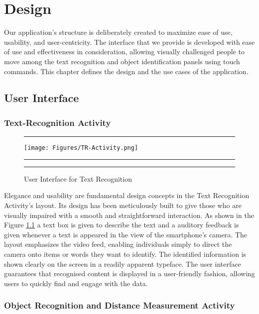 \documentclass[MScCS]{uccthesis}
\begin{document}
\chapter{Design}
Our application's structure is deliberately created to maximize ease of use, usability, and user-centricity. The interface that we provide is developed with ease of use and effectiveness in consideration, allowing visually challenged people to move among the text recognition and object identification panels using touch commands. This chapter defines the design and the use cases of the application.
\section{User Interface}

\subsection{Text-Recognition Activity}
\begin{figure}[H]
      \hrule
      \vspace{0.5em}
     \centering
      \texttt{[image: Figures/TR-Activity.png]}
      \vspace{0.5em}
      \hrule
      \vspace{0.5em}
      \caption{\label{fig:TR-Activity}User Interface for Text Recognition }
      \vspace{0.5em}
      \hrule
   \end{figure}

Elegance and usability are fundamental design concepts in the Text Recognition Activity's layout. Its design has been meticulously built to give those who are visually impaired with a smooth and straightforward interaction. As shown in the Figure \ref{fig:TR-Activity} a text box is given to describe the text and a auditory feedback is given whenever a text is appeared in the view of the smartphone's camera. The layout emphasizes the video feed, enabling individuals simply to direct the camera onto items or words they want to identify. The identified information is shown clearly on the screen in a readily apparent typeface. The user interface guarantees that recognised content is displayed in a user-friendly fashion, allowing users to quickly find and engage with the data.


\subsection{Object Recognition and Distance Measurement Activity}
\end{document}
